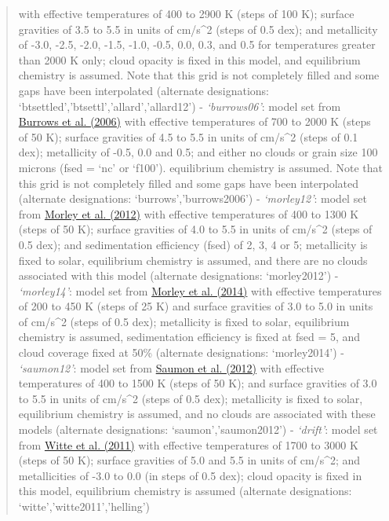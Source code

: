\documentclass[letterpaper,10pt,english]{sphinxmanual}
\begin{document}
\begin{fulllineitems}
\begin{quote}
\begin{description}
\begin{itemize}
with effective temperatures of 400 to 2900 K (steps of 100 K); surface gravities of 3.5 to 5.5 in units of cm/s\textasciicircum{}2 (steps of 0.5 dex); and metallicity of -3.0, -2.5, -2.0, -1.5, -1.0, -0.5, 0.0, 0.3, and 0.5 for temperatures greater than 2000 K only;
cloud opacity is fixed in this model, and equilibrium chemistry is assumed. Note that this grid is not completely filled and some gaps have been interpolated (alternate designations: `btsettled','btsettl','allard','allard12')
- \emph{`burrows06'}: model set from \href{http://adsabs.harvard.edu/abs/2006ApJ...640.1063B}{Burrows et al. (2006)}
with effective temperatures of 700 to 2000 K (steps of 50 K); surface gravities of 4.5 to 5.5 in units of cm/s\textasciicircum{}2 (steps of 0.1 dex); metallicity of -0.5, 0.0 and 0.5; and either no clouds or grain size 100 microns (fsed = `nc' or `f100').
equilibrium chemistry is assumed. Note that this grid is not completely filled and some gaps have been interpolated (alternate designations: `burrows','burrows2006')
- \emph{`morley12'}: model set from \href{http://adsabs.harvard.edu/abs/2012ApJ...756..172M}{Morley et al. (2012)}
with effective temperatures of 400 to 1300 K (steps of 50 K); surface gravities of 4.0 to 5.5 in units of cm/s\textasciicircum{}2 (steps of 0.5 dex); and sedimentation efficiency (fsed) of 2, 3, 4 or 5;
metallicity is fixed to solar, equilibrium chemistry is assumed, and there are no clouds associated with this model (alternate designations: `morley2012')
- \emph{`morley14'}: model set from \href{http://adsabs.harvard.edu/abs/2014ApJ...787...78M}{Morley et al. (2014)}
with effective temperatures of 200 to 450 K (steps of 25 K) and surface gravities of 3.0 to 5.0 in units of cm/s\textasciicircum{}2 (steps of 0.5 dex);
metallicity is fixed to solar, equilibrium chemistry is assumed, sedimentation efficiency is fixed at fsed = 5, and cloud coverage fixed at 50\% (alternate designations: `morley2014')
- \emph{`saumon12'}: model set from \href{http://adsabs.harvard.edu/abs/2012ApJ...750...74S}{Saumon et al. (2012)}
with effective temperatures of 400 to 1500 K (steps of 50 K); and surface gravities of 3.0 to 5.5 in units of cm/s\textasciicircum{}2 (steps of 0.5 dex);
metallicity is fixed to solar, equilibrium chemistry is assumed, and no clouds are associated with these models (alternate designations: `saumon','saumon2012')
- \emph{`drift'}: model set from \href{http://adsabs.harvard.edu/abs/2011A\%26A...529A..44W}{Witte et al. (2011)}
with effective temperatures of 1700 to 3000 K (steps of 50 K); surface gravities of 5.0 and 5.5 in units of cm/s\textasciicircum{}2; and metallicities of -3.0 to 0.0 (in steps of 0.5 dex);
cloud opacity is fixed in this model, equilibrium chemistry is assumed (alternate designations: `witte','witte2011','helling')



\end{itemize}
\end{description}
\end{quote}
\end{fulllineitems}
\end{document}
